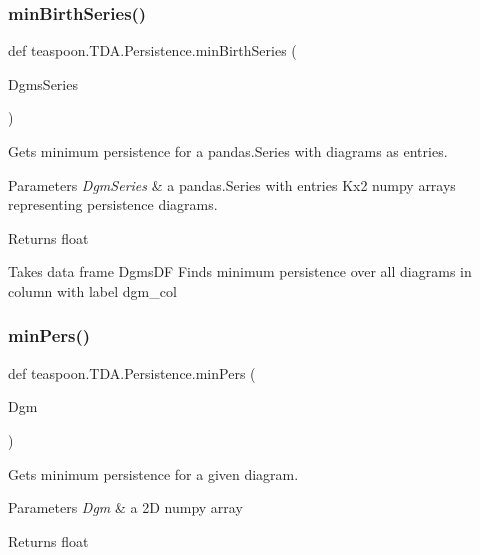 \subsubsection{\texorpdfstring{min\+Birth\+Series()}{minBirthSeries()}}
{\footnotesize\ttfamily def teaspoon.\+T\+D\+A.\+Persistence.\+min\+Birth\+Series (\begin{DoxyParamCaption}\item[{}]{Dgms\+Series }\end{DoxyParamCaption})}



Gets minimum persistence for a pandas.\+Series with diagrams as entries. 


\begin{DoxyParams}{Parameters}
{\em Dgm\+Series} & a pandas.\+Series with entries Kx2 numpy arrays representing persistence diagrams.\\
\hline
\end{DoxyParams}
\begin{DoxyReturn}{Returns}
float \begin{DoxyVerb}Takes data frame DgmsDF
Finds minimum persistence over all diagrams in
column with label dgm_col
\end{DoxyVerb}
 
\end{DoxyReturn}
\mbox{\label{namespaceteaspoon_1_1_t_d_a_1_1_persistence_aadc062063e1ed3050361dba5c7d47a0f}} 
\subsubsection{\texorpdfstring{min\+Pers()}{minPers()}}
{\footnotesize\ttfamily def teaspoon.\+T\+D\+A.\+Persistence.\+min\+Pers (\begin{DoxyParamCaption}\item[{}]{Dgm }\end{DoxyParamCaption})}



Gets minimum persistence for a given diagram. 


\begin{DoxyParams}{Parameters}
{\em Dgm} & a 2D numpy array\\
\hline
\end{DoxyParams}
\begin{DoxyReturn}{Returns}
float 
\end{DoxyReturn}
\mbox{\label{namespaceteaspoon_1_1_t_d_a_1_1_persistence_a5ce3d1bee444c695661556eb59f70d90}} 
